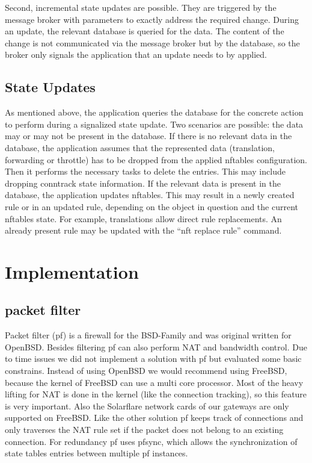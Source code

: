 \documentclass{report}
\begin{document}
Second, incremental state updates are possible. They are triggered by
the message broker with parameters to exactly address the required
change. During an update, the relevant database is queried for the data.
The content of the change is not communicated via the message broker but
by the database, so the broker only signals the application that an
update needs to by applied.

\section{State Updates}\label{state-updates}

As mentioned above, the application queries the database for the
concrete action to perform during a signalized state update. Two
scenarios are possible: the data may or may not be present in the
database. If there is no relevant data in the database, the application
assumes that the represented data (translation, forwarding or throttle)
has to be dropped from the applied nftables configuration. Then it
performs the necessary tasks to delete the entries. This may include
dropping conntrack state information. If the relevant data is present in
the database, the application updates nftables. This may result in a
newly created rule or in an updated rule, depending on the object in
question and the current nftables state. For example, translations allow
direct rule replacements. An already present rule may be updated with
the ``nft replace rule'' command.

\chapter{Implementation}\label{implementation}

\section{packet filter}\label{packet-filter}

Packet filter (pf)\cite{pf}\cite{pfOpenBSD} is a firewall for the BSD-Family and was
original written for OpenBSD. Besides filtering pf can also perform NAT
and bandwidth control. Due to time issues we did not implement a
solution with pf but evaluated some basic constrains. Instead of using
OpenBSD we would recommend using FreeBSD, because the kernel of FreeBSD
can use a multi core processor. Most of the heavy lifting for NAT is
done in the kernel (like the connection tracking), so this feature is
very important. Also the Solarflare network cards of our gateways are
only supported on FreeBSD. Like the other solution pf keeps track of
connections and only traverses the NAT rule set if the packet does not
belong to an existing connection. For redundancy pf uses pfsync\cite{pfsync},
which allows the synchronization of state tables entries between
multiple pf instances.
\end{document}
